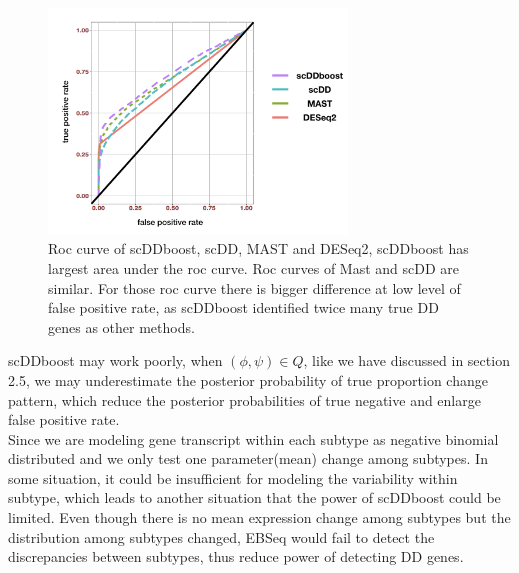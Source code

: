 \documentclass[11pt]{amsart}
\begin{document}
\begin{figure}[h]
  \includegraphics[height = 6cm]{roc.png}
  \caption{Roc curve of scDDboost, scDD, MAST and DESeq2, scDDboost has largest area under the roc curve. Roc curves of Mast and scDD are similar. For those roc curve there is bigger difference at low level of false positive rate, as scDDboost identified twice many true DD genes as other methods.}
  \label{fig:5}
\end{figure}
scDDboost may work poorly, when $(\phi, \psi)\in Q$, like we have discussed in section 2.5, we may underestimate the posterior probability of true proportion change pattern, which reduce the posterior probabilities of true negative and enlarge false positive rate.\\
Since we are modeling gene transcript within each subtype as negative binomial distributed and we only test one parameter(mean) change among subtypes. In some situation, it could be insufficient for modeling the variability within subtype, which leads to another situation that the power of scDDboost could be limited. Even though there is no mean expression change among subtypes but the distribution among subtypes changed, EBSeq would fail to detect the discrepancies between subtypes, thus reduce power of detecting DD genes.\\
\end{document}
